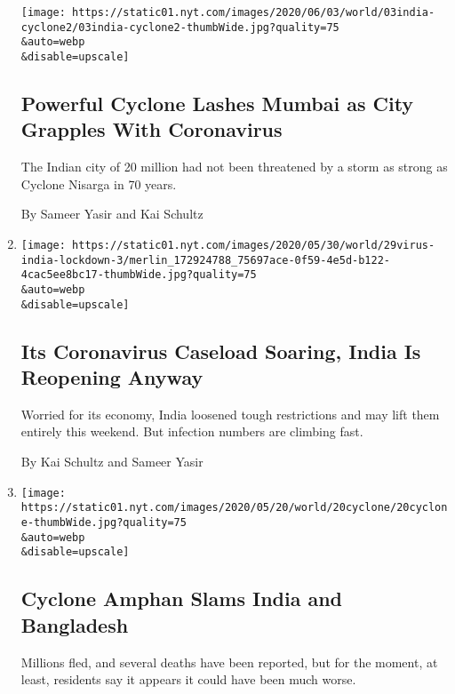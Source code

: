 \begin{enumerate}
  \texttt{[image: https://static01.nyt.com/images/2020/06/03/world/03india-cyclone2/03india-cyclone2-thumbWide.jpg?quality=75\\\&auto=webp\\\&disable=upscale]}

  \hypertarget{powerful-cyclone-lashes-mumbai-as-city-grapples-with-coronavirus}{%
  \subsection{Powerful Cyclone Lashes Mumbai as City Grapples With
  Coronavirus}\label{powerful-cyclone-lashes-mumbai-as-city-grapples-with-coronavirus}}

  The Indian city of 20 million had not been threatened by a storm as
  strong as Cyclone Nisarga in 70 years.

  By Sameer Yasir and Kai Schultz
\item
  \href{/2020/05/29/world/asia/coronavirus-india-lockdown.html}{}

  \texttt{[image: https://static01.nyt.com/images/2020/05/30/world/29virus-india-lockdown-3/merlin\_172924788\_75697ace-0f59-4e5d-b122-4cac5ee8bc17-thumbWide.jpg?quality=75\\\&auto=webp\\\&disable=upscale]}

  \hypertarget{its-coronavirus-caseload-soaring-india-is-reopening-anyway}{%
  \subsection{Its Coronavirus Caseload Soaring, India Is Reopening
  Anyway}\label{its-coronavirus-caseload-soaring-india-is-reopening-anyway}}

  Worried for its economy, India loosened tough restrictions and may
  lift them entirely this weekend. But infection numbers are climbing
  fast.

  By Kai Schultz and Sameer Yasir
\item
  \href{/2020/05/20/world/asia/cyclone-amphan-india-bangladesh.html}{}

  \texttt{[image: https://static01.nyt.com/images/2020/05/20/world/20cyclone/20cyclone-thumbWide.jpg?quality=75\\\&auto=webp\\\&disable=upscale]}

  \hypertarget{cyclone-amphan-slams-india-and-bangladesh}{%
  \subsection{Cyclone Amphan Slams India and
  Bangladesh}\label{cyclone-amphan-slams-india-and-bangladesh}}

  Millions fled, and several deaths have been reported, but for the
  moment, at least, residents say it appears it could have been much
  worse.


\end{enumerate}
